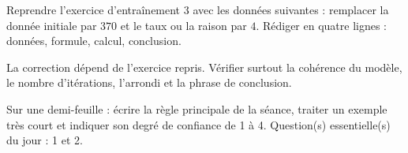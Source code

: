 
\begin{homework}Reprendre l'exercice d'entraînement 3 avec les données suivantes : remplacer la donnée initiale par $370$ et le taux ou la raison par $4$. Rédiger en quatre lignes : données, formule, calcul, conclusion.\end{homework}
\begin{solution}La correction dépend de l'exercice repris. Vérifier surtout la cohérence du modèle, le nombre d'itérations, l'arrondi et la phrase de conclusion.\end{solution}

\begin{exitticket}[3 minutes]Sur une demi-feuille : écrire la règle principale de la séance, traiter un exemple très court et indiquer son degré de confiance de 1 à 4. Question(s) essentielle(s) du jour : 1 et 2.\end{exitticket}

